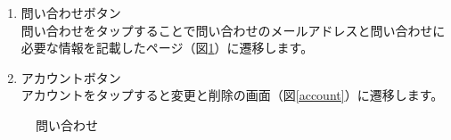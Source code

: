 \documentclass[a4j]{jarticle}
\begin{document}
\begin{enumerate}
  \renewcommand{\labelenumi}{\textcircled{\scriptsize \theenumi}}
\item 問い合わせボタン\\
  問い合わせをタップすることで問い合わせのメールアドレスと問い合わせに必要な情報を記載したページ（図\ref{inquiry}）に遷移します。
\item アカウントボタン\\
  アカウントをタップすると変更と削除の画面（図\ref{account}）に遷移します。
\end{enumerate}

\begin{figure}[H]
    \begin{center}
    \caption {問い合わせ}
    \label{inquiry}
    \end{center}
\end{figure}
\end{document}
